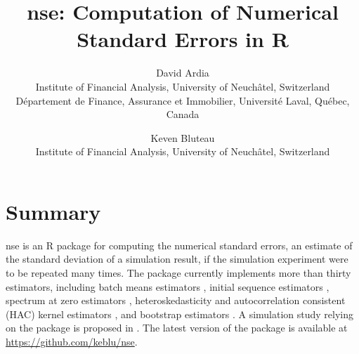 \documentclass[11pt]{article}
\begin{document}
\title{nse: Computation of Numerical Standard Errors in R}
\author{David Ardia\\
Institute of Financial Analysis, University of Neuch\^atel, Switzerland\\
D\'epartement de Finance, Assurance et Immobilier, Universit\'e Laval, Qu\'ebec, Canada
\and
Keven Bluteau\\
Institute of Financial Analysis, University of Neuch\^atel, Switzerland\\
}
	
\maketitle

\section*{Summary}

nse is an R package \citep{R} for computing the numerical standard errors, an estimate of the
standard deviation of a simulation result, if the simulation experiment were to be repeated
many times. The package currently implements more than thirty estimators, including 
batch means estimators \citep[][Section~3.2]{Geyer1992}, initial sequence estimators \citet[][Equation~3.3]{Geyer1992}, spectrum at zero estimators \citep{HeidelbergerWelch1981,FlegalJones2010}, heteroskedasticity and autocorrelation 
consistent (HAC) kernel estimators \citep{NeweyWest1987,Andrews1991,AndrewsMonahan1992,NeweyWest1994,Hirukawa2010}, and bootstrap estimators \citet{PolitisRomano1992,PolitisRomano1994,PolitisWhite2004}. 
A simulation study relying on the package is proposed in \citet{ArdiaEtAl2016}. The latest version of the package is available at \url{https://github.com/keblu/nse}.



	
\end{document}
